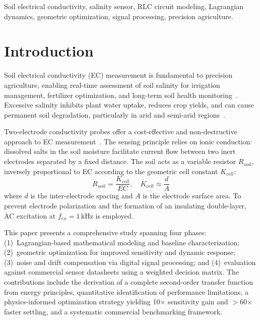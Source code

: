 \documentclass[conference]{IEEEtran}
\begin{document}
\begin{IEEEkeywords}
Soil electrical conductivity, salinity sensor, RLC circuit modeling, Lagrangian dynamics, geometric optimization, signal processing, precision agriculture.
\end{IEEEkeywords}

\section{Introduction}
Soil electrical conductivity (EC) measurement is fundamental to precision agriculture, enabling real-time assessment of soil salinity for irrigation management, fertilizer optimization, and long-term soil health monitoring~\cite{atlas2023}. Excessive salinity inhibits plant water uptake, reduces crop yields, and can cause permanent soil degradation, particularly in arid and semi-arid regions~\cite{vernier2025,rhoades1999,ayers1985}.

Two-electrode conductivity probes offer a cost-effective and non-destructive approach to EC measurement~\cite{corwin2005,fraden2016}. The sensing principle relies on ionic conduction: dissolved salts in the soil moisture facilitate current flow between two inert electrodes separated by a fixed distance. The soil acts as a variable resistor $R_{soil}$, inversely proportional to EC according to the geometric cell constant $K_{cell}$:
\begin{equation}
R_{soil} = \frac{K_{cell}}{EC}, \quad K_{cell} \approx \frac{d}{A}
\label{eq:rsoil}
\end{equation}
where $d$ is the inter-electrode spacing and $A$ is the electrode surface area. To prevent electrode polarization and the formation of an insulating double-layer, AC excitation at $f_{ex} = 1$\,kHz is employed.

This paper presents a comprehensive study spanning four phases: (1)~Lagrangian-based mathematical modeling and baseline characterization; (2)~geometric optimization for improved sensitivity and dynamic response; (3)~noise and drift compensation via digital signal processing; and (4)~evaluation against commercial sensor datasheets using a weighted decision matrix. The contributions include the derivation of a complete second-order transfer function from energy principles, quantitative identification of performance limitations, a physics-informed optimization strategy yielding 10$\times$ sensitivity gain and $>$60$\times$ faster settling, and a systematic commercial benchmarking framework.
\end{document}
